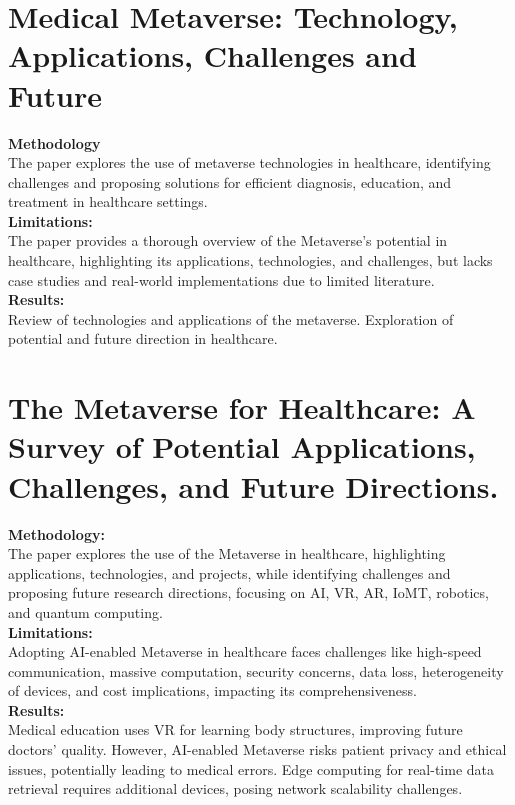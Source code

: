 \section{Medical Metaverse: Technology, Applications, Challenges and Future
	\cite{shao2023medical}}
\textbf{Methodology}\\The paper explores the use of metaverse technologies in healthcare, identifying challenges and proposing solutions for efficient diagnosis, education, and treatment in healthcare settings.\\
\textbf{Limitations:}\\The paper provides a thorough overview of the Metaverse's potential in healthcare, highlighting its applications, technologies, and challenges, but lacks case studies and real-world implementations due to limited literature.\\
\textbf{Results:}\\ Review of technologies and applications of the metaverse. 
Exploration of potential and future direction in healthcare.
\section{The Metaverse for Healthcare: A Survey of Potential Applications, Challenges, and Future Directions.
	\cite{yendurimetaverse}\cite{JournalArticle10}}
\textbf{Methodology:}\\The paper explores the use of the Metaverse in healthcare, highlighting applications, technologies, and projects, while identifying challenges and proposing future research directions, focusing on AI, VR, AR, IoMT, robotics, and quantum computing.\\
\textbf{Limitations:}\\Adopting AI-enabled Metaverse in healthcare faces challenges like high-speed communication, massive computation, security concerns, data loss, heterogeneity of devices, and cost implications, impacting its comprehensiveness.\\
\textbf{Results:}\\
Medical education uses VR for learning body structures, improving future doctors' quality. However, AI-enabled Metaverse risks patient privacy and ethical issues, potentially leading to medical errors. Edge computing for real-time data retrieval requires additional devices, posing network scalability challenges.
